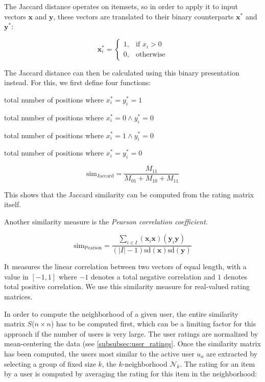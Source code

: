 The Jaccard distance operates on itemsets, so in order to apply it to input vectors $\bm{x}$ and $\bm{y}$, these vectors are translated to their binary counterparts $\bm{x}^{*}$ and $\bm{y}^{*}$:

\begin{equation}
	\bm{x}^{*}_{i} =
	\begin{cases}
	    1,& \text{if } x_i > 0 \\
	    0,& \text{otherwise}
	\end{cases}
\end{equation}

The Jaccard distance can then be calculated using this binary presentation instead.
For this, we first define four functions:

\begin{description}
	\setlength\itemsep{0em}
	\item [$M_{11}$] total number of positions where $x_i^{*}=y_i^*=1$
	\item [$M_{01}$] total number of positions where $x_i^*=0 \land y_i^*=0$
	\item [$M_{10}$] total number of positions where $x_i^*=1 \land y_i^*=0$
	\item [$M_{00}$] total number of positions where $x_i^*=y_i^*=0$
\end{description}

\begin{equation}
	\mathrm{sim}_{\mathrm{Jaccard}}=\frac{M_{11}}{M_{01} + M_{10} + M_{11}}
\end{equation}

This shows that the Jaccard similarity can be computed from the rating matrix itself.

Another similarity measure is the \emph{Pearson correlation coefficient}.

\begin{equation}
	\mathrm{sim}_{\mathrm{Pearson}}=\frac{\sum_{i \in I}(\bm{x}_{i}\bm{x})(\bm{y}_{i}\bm{y})}{(|I|-1)\mathrm{sd}(\bm{x})\mathrm{sd}(\bm{y})}
\end{equation}

It measures the linear correlation between two vectors of equal length, with a value in $[-1,1]$ where $-1$ denotes a total negative correlation and $1$ denotes total positive correlation.
We use this similarity measure for real-valued rating matrices.

In order to compute the neighborhood of a given user, the entire similarity matrix $S$($n \times n$) has to be computed first, which can be a limiting factor for this approach if the number of users is very large.
The user ratings are normalized by mean-centering the data (see \cref{subsubsec:user_ratings}.
Once the similarity matrix has been computed, the users most similar to the active user $u_a$ are extracted by selecting a group of fixed size $k$, the $k$-neighborhood $\mathcal{N}_{k}$.
The rating for an item by a user is computed by averaging the rating for this item in the neighborhood:

